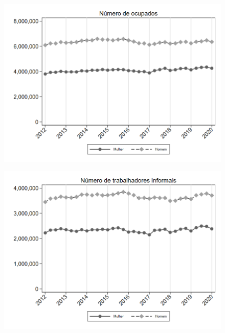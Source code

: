 \begin{frame}[label=_composicao_demografica_genero_n_de_ocupacao]{}
\textit{\hyperlink{_composicao_demografica_genero}{}}
\begin{figure}
  \centering
  \includegraphics[width=1\linewidth]{../../analysis/output/composicao_demografica/genero/_composicao_demografica_genero_n_de_ocupacao.png}
  \caption{}
  \label{fig:_composicao_demografica_genero_n_de_ocupacao}
\end{figure}
\end{frame}

\begin{frame}[label=_composicao_demografica_genero_n_de_informalidade]{}
\textit{\hyperlink{_composicao_demografica_genero}{}}
\begin{figure}
  \centering
  \includegraphics[width=1.0\linewidth]{../../analysis/output/composicao_demografica/genero/_composicao_demografica_genero_n_de_informalidade.png}
  \caption{}
  \label{fig:_composicao_demografica_genero_n_de_informalidade}
\end{figure}
\end{frame}

